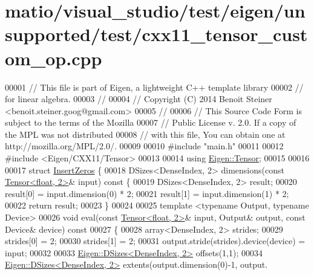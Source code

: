 \hypertarget{matio_2visual__studio_2test_2eigen_2unsupported_2test_2cxx11__tensor__custom__op_8cpp_source}{}\section{matio/visual\+\_\+studio/test/eigen/unsupported/test/cxx11\+\_\+tensor\+\_\+custom\+\_\+op.cpp}
\label{matio_2visual__studio_2test_2eigen_2unsupported_2test_2cxx11__tensor__custom__op_8cpp_source}

\begin{DoxyCode}
00001 \textcolor{comment}{// This file is part of Eigen, a lightweight C++ template library}
00002 \textcolor{comment}{// for linear algebra.}
00003 \textcolor{comment}{//}
00004 \textcolor{comment}{// Copyright (C) 2014 Benoit Steiner <benoit.steiner.goog@gmail.com>}
00005 \textcolor{comment}{//}
00006 \textcolor{comment}{// This Source Code Form is subject to the terms of the Mozilla}
00007 \textcolor{comment}{// Public License v. 2.0. If a copy of the MPL was not distributed}
00008 \textcolor{comment}{// with this file, You can obtain one at http://mozilla.org/MPL/2.0/.}
00009 
00010 \textcolor{preprocessor}{#include "main.h"}
00011 
00012 \textcolor{preprocessor}{#include <Eigen/CXX11/Tensor>}
00013 
00014 \textcolor{keyword}{using} \hyperlink{class_eigen_1_1_tensor}{Eigen::Tensor};
00015 
00016 
00017 \textcolor{keyword}{struct }\hyperlink{struct_insert_zeros}{InsertZeros} \{
00018   DSizes<DenseIndex, 2> dimensions(\textcolor{keyword}{const} \hyperlink{class_eigen_1_1_tensor}{Tensor<float, 2>}& input)\textcolor{keyword}{ const }\{
00019     DSizes<DenseIndex, 2> result;
00020     result[0] = input.dimension(0) * 2;
00021     result[1] = input.dimension(1) * 2;
00022     \textcolor{keywordflow}{return} result;
00023   \}
00024 
00025   \textcolor{keyword}{template} <\textcolor{keyword}{typename} Output, \textcolor{keyword}{typename} Device>
00026   \textcolor{keywordtype}{void} eval(\textcolor{keyword}{const} \hyperlink{class_eigen_1_1_tensor}{Tensor<float, 2>}& input, Output& output, \textcolor{keyword}{const} Device& device)\textcolor{keyword}{ const}
00027 \textcolor{keyword}{  }\{
00028     array<DenseIndex, 2> strides;
00029     strides[0] = 2;
00030     strides[1] = 2;
00031     output.stride(strides).device(device) = input;
00032 
00033     \hyperlink{struct_eigen_1_1_d_sizes}{Eigen::DSizes<DenseIndex, 2>} offsets(1,1);
00034     \hyperlink{struct_eigen_1_1_d_sizes}{Eigen::DSizes<DenseIndex, 2>} extents(output.dimension(0)-1, output.

\end{DoxyCode}
